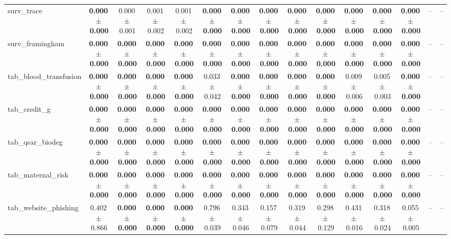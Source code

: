 \documentclass[8pt]{extarticle}
\begin{document}
\begin{longtable}{l*{14}{c}}
surv\_trace & \textbf{0.000\,$\pm$\,0.000} & 0.000\,$\pm$\,0.001 & 0.001\,$\pm$\,0.002 & 0.001\,$\pm$\,0.002 & \textbf{0.000\,$\pm$\,0.000} & \textbf{0.000\,$\pm$\,0.000} & \textbf{0.000\,$\pm$\,0.000} & \textbf{0.000\,$\pm$\,0.000} & \textbf{0.000\,$\pm$\,0.000} & \textbf{0.000\,$\pm$\,0.000} & \textbf{0.000\,$\pm$\,0.000} & \textbf{0.000\,$\pm$\,0.000} & -- & -- \\
surv\_framingham & \textbf{0.000\,$\pm$\,0.000} & \textbf{0.000\,$\pm$\,0.000} & \textbf{0.000\,$\pm$\,0.000} & \textbf{0.000\,$\pm$\,0.000} & \textbf{0.000\,$\pm$\,0.000} & \textbf{0.000\,$\pm$\,0.000} & \textbf{0.000\,$\pm$\,0.000} & \textbf{0.000\,$\pm$\,0.000} & \textbf{0.000\,$\pm$\,0.000} & \textbf{0.000\,$\pm$\,0.000} & \textbf{0.000\,$\pm$\,0.000} & \textbf{0.000\,$\pm$\,0.000} & -- & -- \\
tab\_blood\_transfusion & \textbf{0.000\,$\pm$\,0.000} & \textbf{0.000\,$\pm$\,0.000} & \textbf{0.000\,$\pm$\,0.000} & \textbf{0.000\,$\pm$\,0.000} & 0.033\,$\pm$\,0.042 & \textbf{0.000\,$\pm$\,0.000} & \textbf{0.000\,$\pm$\,0.000} & \textbf{0.000\,$\pm$\,0.000} & \textbf{0.000\,$\pm$\,0.000} & 0.009\,$\pm$\,0.006 & 0.005\,$\pm$\,0.003 & \textbf{0.000\,$\pm$\,0.000} & -- & -- \\
tab\_credit\_g & \textbf{0.000\,$\pm$\,0.000} & \textbf{0.000\,$\pm$\,0.000} & \textbf{0.000\,$\pm$\,0.000} & \textbf{0.000\,$\pm$\,0.000} & \textbf{0.000\,$\pm$\,0.000} & \textbf{0.000\,$\pm$\,0.000} & \textbf{0.000\,$\pm$\,0.000} & \textbf{0.000\,$\pm$\,0.000} & \textbf{0.000\,$\pm$\,0.000} & \textbf{0.000\,$\pm$\,0.000} & \textbf{0.000\,$\pm$\,0.000} & \textbf{0.000\,$\pm$\,0.000} & -- & -- \\
tab\_qsar\_biodeg & \textbf{0.000\,$\pm$\,0.000} & \textbf{0.000\,$\pm$\,0.000} & \textbf{0.000\,$\pm$\,0.000} & \textbf{0.000\,$\pm$\,0.000} & \textbf{0.000\,$\pm$\,0.000} & \textbf{0.000\,$\pm$\,0.000} & \textbf{0.000\,$\pm$\,0.000} & \textbf{0.000\,$\pm$\,0.000} & \textbf{0.000\,$\pm$\,0.000} & \textbf{0.000\,$\pm$\,0.000} & \textbf{0.000\,$\pm$\,0.000} & \textbf{0.000\,$\pm$\,0.000} & -- & -- \\
tab\_maternal\_risk & \textbf{0.000\,$\pm$\,0.000} & \textbf{0.000\,$\pm$\,0.000} & \textbf{0.000\,$\pm$\,0.000} & \textbf{0.000\,$\pm$\,0.000} & \textbf{0.000\,$\pm$\,0.000} & \textbf{0.000\,$\pm$\,0.000} & \textbf{0.000\,$\pm$\,0.000} & \textbf{0.000\,$\pm$\,0.000} & \textbf{0.000\,$\pm$\,0.000} & \textbf{0.000\,$\pm$\,0.000} & \textbf{0.000\,$\pm$\,0.000} & \textbf{0.000\,$\pm$\,0.000} & -- & -- \\
tab\_website\_phishing & 0.402\,$\pm$\,0.866 & \textbf{0.000\,$\pm$\,0.000} & \textbf{0.000\,$\pm$\,0.000} & \textbf{0.000\,$\pm$\,0.000} & 0.796\,$\pm$\,0.039 & 0.343\,$\pm$\,0.046 & 0.157\,$\pm$\,0.079 & 0.319\,$\pm$\,0.044 & 0.298\,$\pm$\,0.129 & 0.431\,$\pm$\,0.016 & 0.318\,$\pm$\,0.024 & 0.055\,$\pm$\,0.005 & -- & -- \\
\end{longtable}
\end{document}
